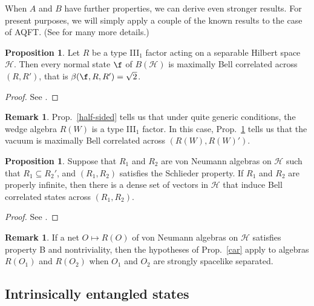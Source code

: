 \documentclass[11pt]{article}
\theoremstyle{definition}
\newtheorem{prop}[thm]{Proposition}
\theoremstyle{definition}
\newtheorem{note}[thm]{Remark}
\theoremstyle{remark}
\def\2#1{{\mathcal #1}}
\begin{document}
When $A$ and $B$ have further properties, we can derive even stronger
results.  For present purposes, we will simply apply a couple of the
known results to the case of AQFT.  (See \cite{sum} for many more
details.)

\begin{prop} Let $R$ be a type III$_1$ factor acting on a separable
  Hilbert space $\2H$.  Then every normal state $\f$ of $B(\2H )$ is
  maximally Bell correlated across $(R,R')$, that is $\beta (\f
  ,R,R')=\sqrt{2}$. \label{max}
\end{prop}

\begin{proof} See \cite{sumwe2,sumwe}. \end{proof}

\begin{note} Prop.\ \ref{half-sided} tells us that under quite generic
  conditions, the wedge algebra $R(W)$ is a type III$_1$ factor.
  In this case, Prop.\ \ref{max} tells us that the vacuum is maximally
  Bell correlated across $(R(W),R(W)')$.  \end{note}

\begin{prop} Suppose that $R_1$ and $R_2$ are von Neumann algebras on
  $\2H$ such that $R_1\subseteq R_2'$, and $(R_1,R_2)$ satisfies the
  Schlieder property.  If $R_1$ and $R_2$ are properly infinite, then
  there is a dense set of vectors in $\2H$ that induce Bell correlated
  states across $(R_1,R_2 )$.  \label{genbell} \label{car} \end{prop}

\begin{proof} See \cite{gbell}. \end{proof}


\begin{note} If a net $O\mapsto R(O)$ of von Neumann algebras on $\2H$
  satisfies property B and nontriviality, then the hypotheses of
  Prop.\ \ref{car} apply to algebras $R(O_1)$ and $R(O_2)$ when $O_1$
  and $O_2$ are strongly spacelike separated.  \end{note}

\bigskip {}


\subsection{Intrinsically entangled states} \label{open}
\end{document}
